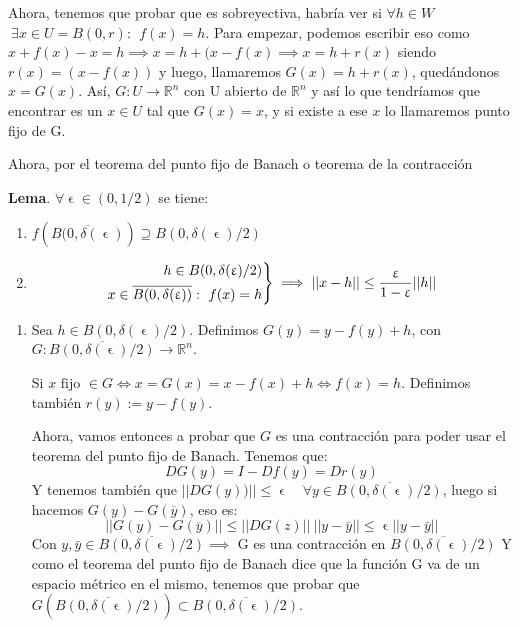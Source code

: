 \documentclass[11pt, a4paper, titlepage]{article}
\makeatletter
\let\epsilon\upvarepsilon
\renewenvironment{proof}[1][\proofname] {\vspace{-15pt}\par\pushQED{\qed}\normalfont\topsep6\p@\@plus6\p@\relax\trivlist\item[\hskip\labelsep\it#1\@addpunct{.}]\ignorespaces}{\popQED\endtrivlist\@endpefalse}
\newcommand{\R}{\mathbb{R}}
\theoremstyle{theorem-style}
\theoremstyle{definition-style}
\theoremstyle{remark-style}
\theoremstyle{example-style}
\newenvironment{nlist}
{\begin{enumerate}
\renewcommand\labelenumi{(\emph{\roman{enumi})}}}
{\end{enumerate}}
\newenvironment{rcases}
  {\left.\begin{aligned}}
  {\end{aligned}\right\rbrace}
\makeatother
\begin{document}
\begin{proof}
\begin{proof}[Demostración del caso particular del teorema]
\begin{proof}[Demostración de la afirmación 1]
\end{proof} %
Ahora, tenemos que probar que es sobreyectiva, habría ver si $\forall h \in W$ $\ \exists x \in U =B(0,r) : \ \ f(x) = h$.
Para empezar, podemos escribir eso como $x+f(x)-x = h \implies x = h+(x-f(x) \implies x = h +r(x)$ siendo $r(x)=(x-f(x))$ y luego, llamaremos $G(x) = h+r(x)$, quedándonos $x=G(x)$. Así, $G: U \to \R^n$ con U abierto de $\R^n$ y así lo que tendríamos que encontrar es un $x\in U$ tal que $G(x) = x$, y si existe a ese $x$ lo llamaremos punto fijo de G.

Ahora, por el teorema del punto fijo de Banach o teorema de la contracción

\textbf{Lema}.
$\forall \epsilon \in (0,1/2)$ se tiene:
\begin{nlist}
	\item $f(\overline{B(0,\delta(\epsilon)}) \supseteq  B(0,\delta(\epsilon)/2)$
	\item \[\begin{rcases}
	h \in B(0, \delta(\epsilon)/2)\\
	x \in \overline{B(0, \delta(\epsilon))} :  \ f(x) = h
\end{rcases} \implies ||x-h|| \leq \frac{\epsilon}{1-\epsilon}||h||\]
\end{nlist}

\begin{proof}[Demostración del lema]
	\begin{nlist}
	\item Sea $h \in B(0, \delta(\epsilon)/2) $. Definimos $G(y) =  y-f(y) +h$, con $G: \overline{B(0, \delta(\epsilon)/2)} \to \R^n$.
	
	Si $x \text{ fijo } \in G \iff x = G(x) = x-f(x) +h \iff f(x) = h$. Definimos también $r(y):= y - f(y)$.
	
	Ahora, vamos entonces a probar que $G$ es una contracción para poder usar el teorema del punto fijo de Banach. Tenemos que:
	\[
	DG(y) = I - Df(y) = Dr(y)
	\]
	Y tenemos también que $||DG(y))|| \leq \epsilon \quad \forall y \in \overline{B(0, \delta(\epsilon)/2)}$, luego si hacemos $G(y) - G(\overline{y})$, eso es:
	\[
	||G(y) - G(\overline{y})|| \leq ||DG(z)||\ ||y-\bar{y}|| \leq \epsilon ||y-\bar{y}||
	\]
	Con $y,\bar{y} \in \overline{B(0, \delta(\epsilon)/2)} \implies  $ G es una contracción en $\overline{B(0, \delta(\epsilon)/2)}$
	Y como el teorema del punto fijo de Banach dice que la función G va de un espacio métrico en el mismo, tenemos que probar que $G(\overline{B(0, \delta(\epsilon)/2)}) \subset \overline{B(0, \delta(\epsilon)/2)}$.
	

\end{nlist}
\end{proof}
\end{proof}
\end{proof}
\end{document}
